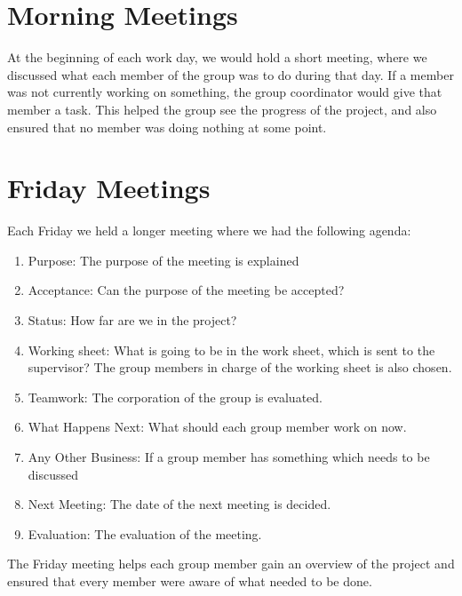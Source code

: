 \section{Morning Meetings}
At the beginning of each work day, we would hold a short meeting, where we discussed what each member of the group was to do during that day. If a member was not currently working on something, the group coordinator would give that member a task. This helped the group see the progress of the project, and also ensured that no member was doing nothing at some point.

\section{Friday Meetings}
Each Friday we held a longer meeting where we had the following agenda:

\begin{enumerate}
	\item Purpose: The purpose of the meeting is explained
	\item Acceptance: Can the purpose of the meeting be accepted? 
	\item Status: How far are we in the project?
	\item Working sheet: What is going to be in the work sheet, which is sent to the supervisor? The group members in charge of the working sheet is also chosen. 
	\item Teamwork: The corporation of the group is evaluated.  
	\item What Happens Next: What should each group member work on now.
	\item Any Other Business: If a group member has something which needs to be discussed
	\item Next Meeting: The date of the next meeting is decided. 
	\item Evaluation: The evaluation of the meeting. 
\end{enumerate}

The Friday meeting helps each group member gain an overview of the project and ensured that every member were aware of what needed to be done.